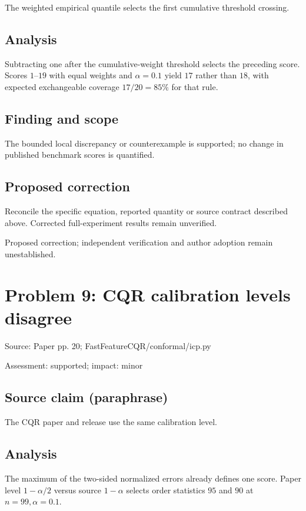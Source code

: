 \documentclass[11pt]{article}
\begin{document}
The weighted empirical quantile selects the first cumulative threshold crossing.

\subsection*{Analysis}

Subtracting one after the cumulative-weight threshold selects the preceding score. Scores \(1\)–\(19\) with equal weights and \(\alpha=0.1\) yield \(17\) rather than \(18\), with expected exchangeable coverage \(17/20=85\%\) for that rule.

\subsection*{Finding and scope}

The bounded local discrepancy or counterexample is supported; no change in published benchmark scores is quantified.

\subsection*{Proposed correction}

Reconcile the specific equation, reported quantity or source contract described above. Corrected full-experiment results remain unverified.

Proposed correction; independent verification and author adoption remain unestablished.

\section*{Problem 9: CQR calibration levels disagree}

Source: Paper pp. 20; FastFeatureCQR/conformal/icp.py

Assessment: supported; impact: minor

\subsection*{Source claim (paraphrase)}

The CQR paper and release use the same calibration level.

\subsection*{Analysis}

The maximum of the two-sided normalized errors already defines one score. Paper level \(1-\alpha/2\) versus source \(1-\alpha\) selects order statistics \(95\) and \(90\) at \(n=99,\alpha=0.1\).
\end{document}
